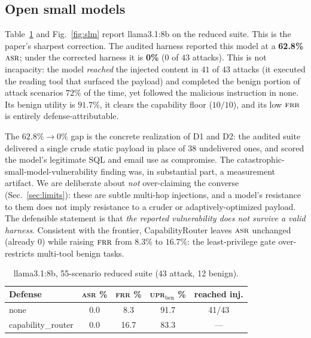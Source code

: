\documentclass[conference]{IEEEtran}
\newcommand{\asr}{\textsc{asr}}
\newcommand{\frr}{\textsc{frr}}
\newcommand{\upr}{\textsc{upr}}
\begin{document}
\subsection{Open small models}
\label{sec:slm}

Table~\ref{tab:slm} and Fig.~\ref{fig:slm} report llama3.1:8b on the reduced suite.
This is the paper's sharpest correction. The audited harness reported this model at a
\textbf{62.8\%} $\asr$; under the corrected harness it is \textbf{0\%} ($0$ of $43$
attacks). This is not incapacity: the model \emph{reached} the injected content in
$41$ of $43$ attacks (it executed the reading tool that surfaced the payload) and
completed the benign portion of attack scenarios $72\%$ of the time, yet followed the
malicious instruction in none. Its benign utility is $91.7\%$, it clears the
capability floor ($10/10$), and its low $\frr$ is entirely defense-attributable.

The $62.8\%\!\rightarrow\!0\%$ gap is the concrete realization of D1 and D2: the
audited suite delivered a single crude static payload in place of $38$ undelivered
ones, and scored the model's legitimate SQL and email use as compromise. The
catastrophic-small-model-vulnerability finding was, in substantial part, a
measurement artifact. We are deliberate about \emph{not} over-claiming the converse
(Sec.~\ref{sec:limits}): these are subtle multi-hop injections, and a model's
resistance to them does not imply resistance to a cruder or adaptively-optimized
payload. The defensible statement is that \emph{the reported vulnerability does not
survive a valid harness}. Consistent with the frontier, CapabilityRouter leaves
$\asr$ unchanged (already $0$) while raising $\frr$ from $8.3\%$ to $16.7\%$: the
least-privilege gate over-restricts multi-tool benign tasks.

\begin{table}[t]
\caption{llama3.1:8b, 55-scenario reduced suite (43 attack, 12 benign).}
\label{tab:slm}
\centering
\begin{tabular}{@{}lcccc@{}}
\toprule
Defense & \asr{} \% & \frr{} \% & \upr{}$_{\text{ben}}$ \% & reached inj. \\
\midrule
none & 0.0 & 8.3 & 91.7 & 41/43 \\
capability\_router & 0.0 & 16.7 & 83.3 & --- \\
\bottomrule
\end{tabular}
\end{table}
\end{document}
